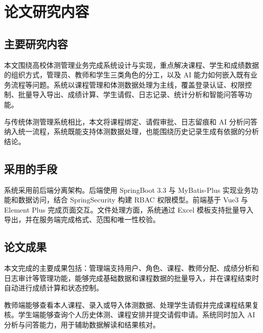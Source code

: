 \section{论文研究内容}

\subsection{主要研究内容}

本文围绕高校体测管理业务完成系统设计与实现，重点解决课程、学生和成绩数据的组织方式，管理员、教师和学生三类角色的分工，以及 AI 能力如何嵌入既有业务流程等问题。系统以课程管理和体测数据处理为主线，覆盖登录认证、权限控制、批量导入导出、成绩计算、学生请假、日志记录、统计分析和智能问答等功能。

与传统体测管理系统相比，本文将课程绑定、请假审批、日志留痕和 AI 分析问答纳入统一流程，系统既能支持体测数据处理，也能围绕历史记录生成有依据的分析结论。

\subsection{采用的手段}

系统采用前后端分离架构。后端使用 SpringBoot 3.3 与 MyBatis-Plus 实现业务功能和数据访问，结合 SpringSecurity 构建 RBAC 权限模型。前端基于 Vue3 与 Element Plus 完成页面交互。文件处理方面，系统通过 Excel 模板支持批量导入导出，并在服务端完成格式、范围和唯一性校验。

\subsection{论文成果}

本文完成的主要成果包括：管理端支持用户、角色、课程、教师分配、成绩分析和日志审计等管理功能，能够完成基础数据和课程数据的批量导入，并在课程结束时自动进行成绩计算和状态控制。

教师端能够查看本人课程、录入或导入体测数据、处理学生请假并完成课程结果复核。学生端能够查询个人历史体测、课程安排并提交请假申请。系统同时加入 AI 分析与问答能力，用于辅助数据解读和结果核对。
